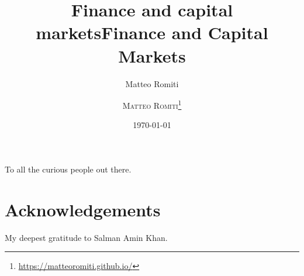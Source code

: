 \documentclass[a4paper,11pt]{book}
\title{Finance and capital markets}
\author{Matteo Romiti}
\date{\today}
\title{\Huge \textbf{Finance and Capital Markets}\\}
\author{\textsc{Matteo Romiti}\thanks{\url{https://matteoromiti.github.io/}}}
\newenvironment{dedication}
{
   \cleardoublepage
   \thispagestyle{empty}
   \vspace*{\stretch{1}}
   \hfill\begin{minipage}[t]{0.66\textwidth}
   \raggedright
}
{
   \end{minipage}
   \vspace*{\stretch{3}}
   \clearpage
}
\begin{document}
\frontmatter
\maketitle

\begin{dedication}
To all the curious people out there.
\end{dedication}

\hypertarget{ToC}{}
\tableofcontents

\mainmatter



\section*{Acknowledgements}
My deepest gratitude to Salman Amin Khan.












% 




\end{document}
